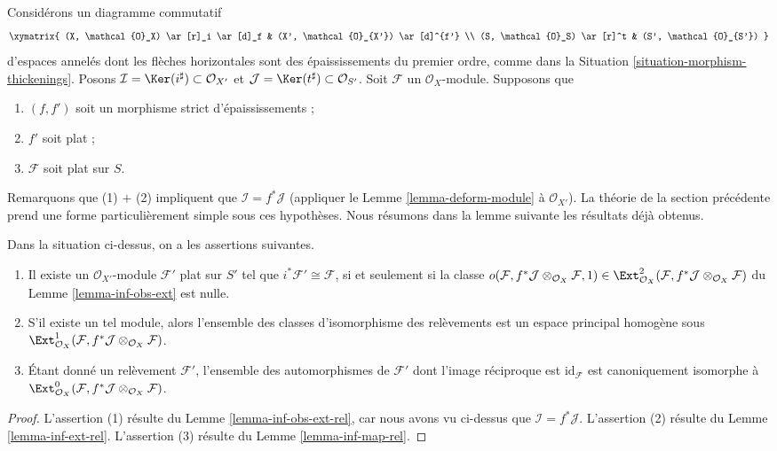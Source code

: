 \noindent
Considérons un diagramme commutatif
$$
\xymatrix{
(X, \mathcal{O}_X) \ar[r]_i \ar[d]_f & (X', \mathcal{O}_{X'}) \ar[d]^{f'} \\
(S, \mathcal{O}_S) \ar[r]^t & (S', \mathcal{O}_{S'})
}
$$
d'espaces annelés dont les flèches horizontales sont des épaississements du premier ordre,
comme dans la Situation \ref{situation-morphism-thickenings}. Posons
$\mathcal{I} = \Ker(i^\sharp) \subset \mathcal{O}_{X'}$ et
$\mathcal{J} = \Ker(t^\sharp) \subset \mathcal{O}_{S'}$.
Soit $\mathcal{F}$ un $\mathcal{O}_X$-module. Supposons que
\begin{enumerate}
\item $(f, f')$ soit un morphisme strict d'épaississements ;
\item $f'$ soit plat ;
\item $\mathcal{F}$ soit plat sur $S$.
\end{enumerate}
Remarquons que (1) $+$ (2) impliquent que $\mathcal{I} = f^*\mathcal{J}$
(appliquer le Lemme \ref{lemma-deform-module} à $\mathcal{O}_{X'}$).
La théorie de la section précédente prend une forme particulièrement simple
sous ces hypothèses. Nous résumons dans la lemme suivante les résultats déjà obtenus.

\begin{lemma}
\label{lemma-flat}
Dans la situation ci-dessus, on a les assertions suivantes.
\begin{enumerate}
\item Il existe un $\mathcal{O}_{X'}$-module $\mathcal{F}'$ plat sur
$S'$ tel que $i^*\mathcal{F}' \cong \mathcal{F}$, si et seulement si
la classe
$o(\mathcal{F}, f^*\mathcal{J} \otimes_{\mathcal{O}_X} \mathcal{F}, 1)
\in \Ext^2_{\mathcal{O}_X}(
\mathcal{F}, f^*\mathcal{J} \otimes_{\mathcal{O}_X} \mathcal{F})$
du Lemme \ref{lemma-inf-obs-ext} est nulle.
\item S'il existe un tel module, alors l'ensemble des classes d'isomorphisme
des relèvements est un espace principal homogène sous
$\Ext^1_{\mathcal{O}_X}(
\mathcal{F}, f^*\mathcal{J} \otimes_{\mathcal{O}_X} \mathcal{F})$.
\item Étant donné un relèvement $\mathcal{F}'$, l'ensemble des automorphismes de
$\mathcal{F}'$ dont l'image réciproque est $\text{id}_\mathcal{F}$ est canoniquement
isomorphe à $\Ext^0_{\mathcal{O}_X}(
\mathcal{F}, f^*\mathcal{J} \otimes_{\mathcal{O}_X} \mathcal{F})$.
\end{enumerate}
\end{lemma}

\begin{proof}
L'assertion (1) résulte du Lemme \ref{lemma-inf-obs-ext-rel},
car nous avons vu ci-dessus que $\mathcal{I} = f^*\mathcal{J}$.
L'assertion (2) résulte du Lemme \ref{lemma-inf-ext-rel}.
L'assertion (3) résulte du Lemme \ref{lemma-inf-map-rel}.
\end{proof}

